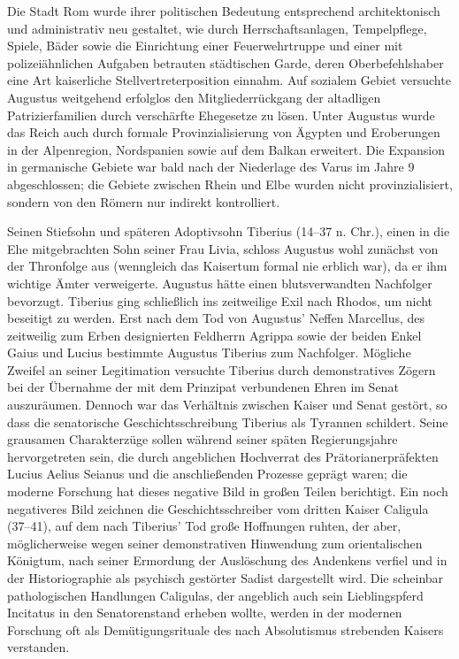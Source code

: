 Die Stadt Rom wurde ihrer politischen Bedeutung entsprechend architektonisch und administrativ neu gestaltet, wie durch Herrschaftsanlagen, Tempelpflege, Spiele, Bäder sowie die Einrichtung einer Feuerwehrtruppe und einer mit polizeiähnlichen Aufgaben betrauten städtischen Garde, deren Oberbefehlshaber eine Art kaiserliche Stellvertreterposition einnahm. Auf sozialem Gebiet versuchte Augustus weitgehend erfolglos den Mitgliederrückgang der altadligen Patrizierfamilien durch verschärfte Ehegesetze zu lösen. Unter Augustus wurde das Reich auch durch formale Provinzialisierung von Ägypten und Eroberungen in der Alpenregion, Nordspanien sowie auf dem Balkan erweitert. Die Expansion in germanische Gebiete war bald nach der Niederlage des Varus im Jahre 9 abgeschlossen; die Gebiete zwischen Rhein und Elbe wurden nicht provinzialisiert, sondern von den Römern nur indirekt kontrolliert.

Seinen Stiefsohn und späteren Adoptivsohn Tiberius (14–37 n. Chr.), einen in die Ehe mitgebrachten Sohn seiner Frau Livia, schloss Augustus wohl zunächst von der Thronfolge aus (wenngleich das Kaisertum formal nie erblich war), da er ihm wichtige Ämter verweigerte. Augustus hätte einen blutsverwandten Nachfolger bevorzugt. Tiberius ging schließlich ins zeitweilige Exil nach Rhodos, um nicht beseitigt zu werden. Erst nach dem Tod von Augustus’ Neffen Marcellus, des zeitweilig zum Erben designierten Feldherrn Agrippa sowie der beiden Enkel Gaius und Lucius bestimmte Augustus Tiberius zum Nachfolger. Mögliche Zweifel an seiner Legitimation versuchte Tiberius durch demonstratives Zögern bei der Übernahme der mit dem Prinzipat verbundenen Ehren im Senat auszuräumen. Dennoch war das Verhältnis zwischen Kaiser und Senat gestört, so dass die senatorische Geschichtsschreibung Tiberius als Tyrannen schildert. Seine grausamen Charakterzüge sollen während seiner späten Regierungsjahre hervorgetreten sein, die durch angeblichen Hochverrat des Prätorianerpräfekten Lucius Aelius Seianus und die anschließenden Prozesse geprägt waren; die moderne Forschung hat dieses negative Bild in großen Teilen berichtigt.
Ein noch negativeres Bild zeichnen die Geschichtsschreiber vom dritten Kaiser Caligula (37–41), auf dem nach Tiberius’ Tod große Hoffnungen ruhten, der aber, möglicherweise wegen seiner demonstrativen Hinwendung zum orientalischen Königtum, nach seiner Ermordung der Auslöschung des Andenkens verfiel und in der Historiographie als psychisch gestörter Sadist dargestellt wird. Die scheinbar pathologischen Handlungen Caligulas, der angeblich auch sein Lieblingspferd Incitatus in den Senatorenstand erheben wollte, werden in der modernen Forschung oft als Demütigungsrituale des nach Absolutismus strebenden Kaisers verstanden.

